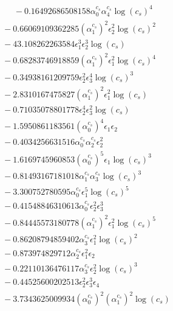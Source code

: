 \documentclass[10pt]{article}
\begin{document}
\begin{align*}
\phantom{F_{s,6}} &\phantom{={}}{}  - 0.16492686508158 \alpha_{0}^{c_s} \alpha_{4}^{c_s} \log{\left(c_{s} \right)}^{4} \\
&{}  - 0.66069109362285 \left(\alpha_{1}^{c_s}\right)^{2} \epsilon_{2}^{2} \log{\left(c_{s} \right)}^{2} \\
&{}  - 43.108262263584 \epsilon_{1}^{3} \epsilon_{2}^{3} \log{\left(c_{s} \right)} \\
&{}  - 0.68283746918859 \left(\alpha_{1}^{c_s}\right)^{2} \epsilon_{1}^{2} \log{\left(c_{s} \right)}^{4} \\
&{}  - 0.34938161209759 \epsilon_{2}^{2} \epsilon_{3}^{4} \log{\left(c_{s} \right)}^{3} \\
&{}  - 2.8310167475827 \left(\alpha_{1}^{c_s}\right)^{2} \epsilon_{1}^{2} \log{\left(c_{s} \right)} \\
&{}  - 0.71035078801778 \epsilon_{2}^{4} \epsilon_{3}^{2} \log{\left(c_{s} \right)} \\
&{}  - 1.5950861183561 \left(\alpha_{0}^{c_s}\right)^{4} \epsilon_{1} \epsilon_{2} \\
&{}  - 0.4034256631516 \alpha_{0}^{c_s} \alpha_{2}^{c_s} \epsilon_{2}^{2} \\
&{}  - 1.6169745960853 \left(\alpha_{0}^{c_s}\right)^{5} \epsilon_{1} \log{\left(c_{s} \right)}^{3} \\
&{}  - 0.81493167181018 \alpha_{1}^{c_s} \alpha_{3}^{c_s} \log{\left(c_{s} \right)}^{3} \\
&{}  - 3.300752780595 \alpha_{0}^{c_s} \epsilon_{1}^{5} \log{\left(c_{s} \right)}^{5} \\
&{}  - 0.41548846310613 \alpha_{0}^{c_s} \epsilon_{2}^{2} \epsilon_{3}^{3} \\
&{}  - 0.84445573180778 \left(\alpha_{1}^{c_s}\right)^{2} \epsilon_{1}^{2} \log{\left(c_{s} \right)}^{5} \\
&{}  - 0.86208794859402 \alpha_{3}^{c_s} \epsilon_{1}^{2} \log{\left(c_{s} \right)}^{2} \\
&{}  - 0.873974829712 \alpha_{2}^{c_s} \epsilon_{1}^{2} \epsilon_{2} \\
&{}  - 0.22110136476117 \alpha_{3}^{c_s} \epsilon_{2}^{2} \log{\left(c_{s} \right)}^{3} \\
&{}  - 0.44525600202513 \epsilon_{2}^{2} \epsilon_{3}^{3} \epsilon_{4} \\
&{}  - 3.7343625009934 \left(\alpha_{0}^{c_s}\right)^{2} \left(\alpha_{1}^{c_s}\right)^{2} \log{\left(c_{s} \right)} \\

\end{align*}
\end{document}
